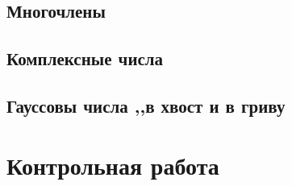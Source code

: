 \documentclass[10pt, twoside]{article}
\begin{document}
\subsection{Многочлены}
% 
\subsection{Комплексные числа}
% 
\subsection{Гауссовы числа ,,в хвост и в гриву} %

\newpage
{}
\section*{Контрольная работа}
% 
\end{document}
